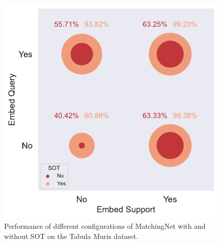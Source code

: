 \begin{figure}
    \centering
    \includegraphics[width=1\columnwidth]{../figures/sot-interaction-scatter.pdf}
    \caption{Performance of different configurations of MatchingNet with and without SOT on the Tabula Muris dataset.}
    \label{fig:sot-interaction-scatter}
\end{figure}